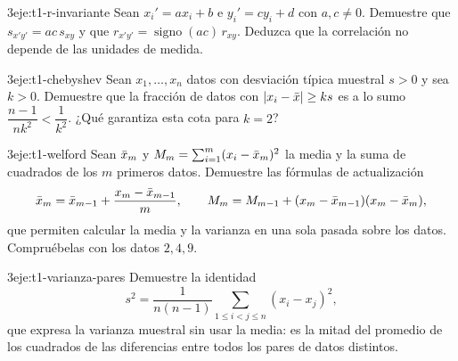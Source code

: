 \begin{ejercicio}{3}{eje:t1-r-invariante}
Sean $x_i'=ax_i+b$ e $y_i'=cy_i+d$ con $a,c\neq0$. Demuestre que $s_{x'y'}=ac\,s_{xy}$ y que $r_{x'y'}=\operatorname{signo}(ac)\,r_{xy}$. Deduzca que la correlación no depende de las unidades de medida.
\end{ejercicio}

\begin{ejercicio}{3}{eje:t1-chebyshev}
Sean $x_1,\dots,x_n$ datos con desviación típica muestral $s>0$ y sea $k>0$. Demuestre que la fracción de datos con $\lvert x_i-\bar{x}\rvert\ge ks$ es a lo sumo $\dfrac{n-1}{n k^{2}}<\dfrac{1}{k^{2}}$. ¿Qué garantiza esta cota para $k=2$?
\end{ejercicio}

\begin{ejercicio}{3}{eje:t1-welford}
Sean $\bar{x}_m$ y $M_m=\sum_{i=1}^{m}(x_i-\bar{x}_m)^{2}$ la media y la suma de cuadrados de los $m$ primeros datos. Demuestre las fórmulas de actualización
\[
\bar{x}_m=\bar{x}_{m-1}+\frac{x_m-\bar{x}_{m-1}}{m},\qquad M_m=M_{m-1}+(x_m-\bar{x}_{m-1})(x_m-\bar{x}_m),
\]
que permiten calcular la media y la varianza en una sola pasada sobre los datos. Compruébelas con los datos $2,4,9$.
\end{ejercicio}

\begin{ejercicio}{3}{eje:t1-varianza-pares}
Demuestre la identidad
\[
s^{2}=\frac{1}{n(n-1)}\sum_{1\le i<j\le n}(x_i-x_j)^{2},
\]
que expresa la varianza muestral sin usar la media: es la mitad del promedio de los cuadrados de las diferencias entre todos los pares de datos distintos.
\end{ejercicio}
